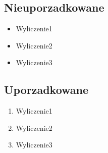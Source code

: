 \documentclass{report}
\begin{document}
        \subsection{Nieuporzadkowane}
            \begin{itemize}
                \item Wyliczenie1
                \item Wyliczenie2
                \item Wyliczenie3
            \end{itemize}

        \subsection{Uporzadkowane}
            \begin{enumerate}
                \item Wyliczenie1
                \item Wyliczenie2
                \item Wyliczenie3
            \end{enumerate}
\end{document}
